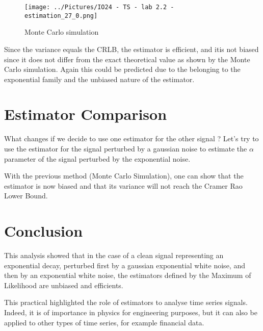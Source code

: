 \begin{figure}[h]
\centering
\texttt{[image: ../Pictures/IO24 - TS - lab 2.2 - estimation\_27\_0.png]}
\caption{Monte Carlo simulation}
\end{figure}

Since the variance equals the CRLB, the estimator is efficient, and itis not biased since it does not differ from the exact theoretical value as shown by the Monte Carlo simulation. Again this could be predicted due to the belonging to the exponential family and the unbiased nature of the estimator.


\section{Estimator Comparison}
What changes if we decide to use one estimator for the other signal ? Let's try to use the estimator for the signal perturbed by a gaussian noise to estimate the \( \alpha \) parameter of the signal perturbed by the exponential noise.

With the previous method (Monte Carlo Simulation), one can show that the estimator is now biased and that its variance will not reach the Cramer Rao Lower Bound.

\section{Conclusion}

This analysis showed that in the case of a clean signal representing an exponential decay, perturbed first by a gaussian exponential white noise, and then by an exponential white noise, the estimators defined by the Maximum of Likelihood are unbiased and efficients.

This practical highlighted the role of estimators to analyse time series signals. Indeed, it is of importance in physics for engineering purposes, but it can also be applied to other types of time series, for example financial data.